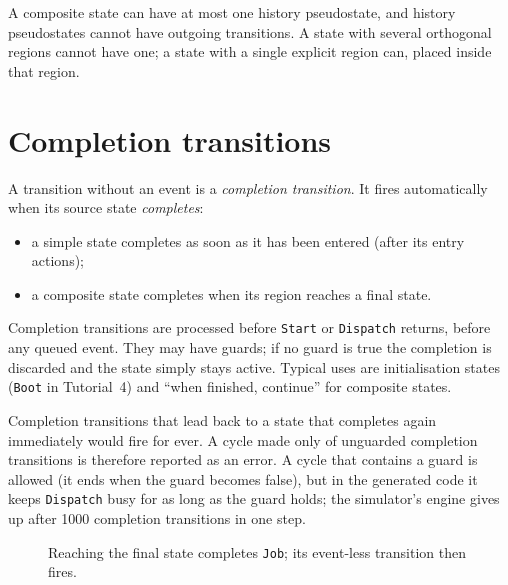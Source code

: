\documentclass[11pt,a4paper,openany]{report}
\newcommand{\code}[1]{\texttt{#1}}
\begin{document}
A composite state can have at most one history pseudostate, and history pseudostates cannot have
outgoing transitions. A state with several orthogonal regions cannot have one; a state with a single
explicit region can, placed inside that region.

\section{Completion transitions}
\label{sec:completion}
A transition without an event is a \emph{completion transition}. It fires automatically when its source
state \emph{completes}:
\begin{itemize}[itemsep=1pt]
  \item a simple state completes as soon as it has been entered (after its entry actions);
  \item a composite state completes when its region reaches a final state.
\end{itemize}
Completion transitions are processed before \code{Start} or \code{Dispatch} returns, before any queued
event. They may have guards; if no guard is true the completion is discarded and the state simply stays
active. Typical uses are initialisation states (\code{Boot} in Tutorial~4) and ``when finished,
continue'' for composite states.

Completion transitions that lead back to a state that completes again immediately would fire for
ever. A cycle made only of unguarded completion transitions is therefore reported as an error. A cycle
that contains a guard is allowed (it ends when the guard becomes false), but in the generated code it
keeps \code{Dispatch} busy for as long as the guard holds; the simulator's engine gives up after 1000
completion transitions in one step.

\begin{figure}[H]
\centering
{}
\caption{Reaching the final state completes \code{Job}; its event-less transition then fires.}
\end{figure}
\end{document}
